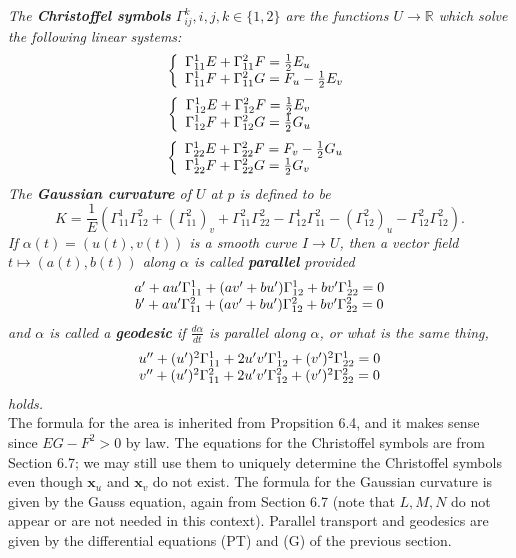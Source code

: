 \documentclass[leqno]{book}
\begin{document}
\emph{The \textbf{Christoffel symbols} $\Gamma_{ij}^k,i,j,k\in\{1,2\}$ are the functions $U\to\mathbb R$ which solve the following linear systems:}
$$\left\{\begin{array}{c l}\Gamma_{11}^1E+\Gamma_{11}^2F=\frac 12E_u~~~~~~~\\\Gamma_{11}^1F+\Gamma_{11}^2G=F_u-\frac 12E_v\end{array}\right.$$
$$\left\{\begin{array}{c l}\Gamma_{12}^1E+\Gamma_{12}^2F=\frac 12E_v~~~~~~~\\\Gamma_{12}^1F+\Gamma_{12}^2G=\frac 12G_u~~~~~~~\end{array}\right.$$
$$\left\{\begin{array}{c l}\Gamma_{22}^1E+\Gamma_{22}^2F=F_v-\frac 12G_u\\\Gamma_{22}^1F+\Gamma_{22}^2G=\frac 12G_v~~~~~~~\end{array}\right.$$
\emph{The \textbf{Gaussian curvature} of $U$ at $p$ is defined to be}
$$K=\frac 1E\left(\Gamma_{11}^1\Gamma_{12}^2+(\Gamma_{11}^2)_v+\Gamma_{11}^2\Gamma_{22}^2-\Gamma_{12}^1\Gamma_{11}^2-(\Gamma_{12}^2)_u-\Gamma_{12}^2\Gamma_{12}^2\right).$$
\emph{If $\alpha(t)=(u(t),v(t))$ is a smooth curve $I\to U$, then a vector field $t\mapsto(a(t),b(t))$ along $\alpha$ is called \textbf{parallel} provided}
$$\begin{array}{c l}a'+au'\Gamma_{11}^1+(av'+bu')\Gamma_{12}^1+bv'\Gamma_{22}^1=0\\b'+au'\Gamma_{11}^2+(av'+bu')\Gamma_{12}^2+bv'\Gamma_{22}^2=0\end{array}$$
\emph{and $\alpha$ is called a \textbf{geodesic} if $\frac{d\alpha}{dt}$ is parallel along $\alpha$, or what is the same thing,}
$$\begin{array}{c l}u''+(u')^2\Gamma_{11}^1+2u'v'\Gamma_{12}^1+(v')^2\Gamma_{22}^1=0\\v''+(u')^2\Gamma_{11}^2+2u'v'\Gamma_{12}^2+(v')^2\Gamma_{22}^2=0\end{array}$$
\emph{holds.}\\

\noindent The formula for the area is inherited from Propsition 6.4, and it makes sense since $EG-F^2>0$ by law.  The equations for the Christoffel symbols are from Section 6.7; we may still use them to uniquely determine the Christoffel symbols even though $\mathbf x_u$ and $\mathbf x_v$ do not exist.  The formula for the Gaussian curvature is given by the Gauss equation, again from Section 6.7 (note that $L,M,N$ do not appear or are not needed in this context).  Parallel transport and geodesics are given by the differential equations (PT) and (G) of the previous section.
\end{document}
